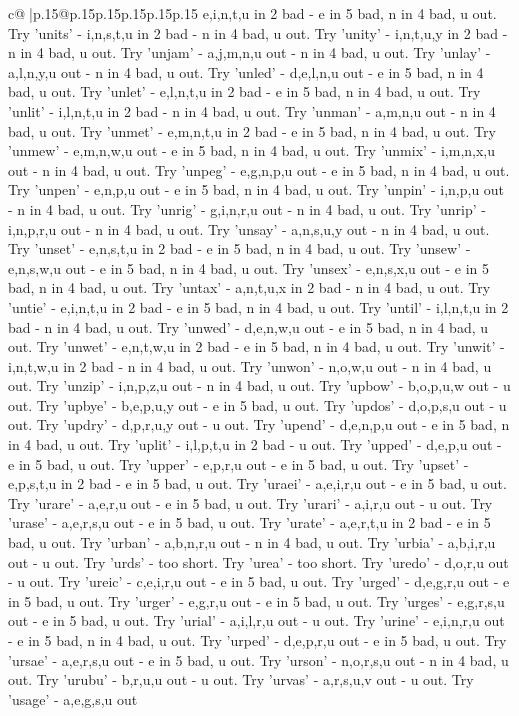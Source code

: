 \documentclass{article}
\begin{document}
{\begin{supertabular}{c@{$\;$}|p{.15\linewidth}@{}p{.15\linewidth}p{.15\linewidth}p{.15\linewidth}p{.15\linewidth}p{.15\linewidth}}
{{{e,i,n,t,u in 2 bad {-} e in 5 bad, n in 4 bad, u out. Try 'units' {-} i,n,s,t,u in 2 bad {-} n in 4 bad, u out. Try 'unity' {-} i,n,t,u,y in 2 bad {-} n in 4 bad, u out. Try 'unjam' {-} a,j,m,n,u out {-} n in 4 bad, u out. Try 'unlay' {-} a,l,n,y,u out {-} n in 4 bad, u out. Try 'unled' {-} d,e,l,n,u out {-} e in 5 bad, n in 4 bad, u out. Try 'unlet' {-} e,l,n,t,u in 2 bad {-} e in 5 bad, n in 4 bad, u out. Try 'unlit' {-} i,l,n,t,u in 2 bad {-} n in 4 bad, u out. Try 'unman' {-} a,m,n,u out {-} n in 4 bad, u out. Try 'unmet' {-} e,m,n,t,u in 2 bad {-} e in 5 bad, n in 4 bad, u out. Try 'unmew' {-} e,m,n,w,u out {-} e in 5 bad, n in 4 bad, u out. Try 'unmix' {-} i,m,n,x,u out {-} n in 4 bad, u out. Try 'unpeg' {-} e,g,n,p,u out {-} e in 5 bad, n in 4 bad, u out. Try 'unpen' {-} e,n,p,u out {-} e in 5 bad, n in 4 bad, u out. Try 'unpin' {-} i,n,p,u out {-} n in 4 bad, u out. Try 'unrig' {-} g,i,n,r,u out {-} n in 4 bad, u out. Try 'unrip' {-} i,n,p,r,u out {-} n in 4 bad, u out. Try 'unsay' {-} a,n,s,u,y out {-} n in 4 bad, u out. Try 'unset' {-} e,n,s,t,u in 2 bad {-} e in 5 bad, n in 4 bad, u out. Try 'unsew' {-} e,n,s,w,u out {-} e in 5 bad, n in 4 bad, u out. Try 'unsex' {-} e,n,s,x,u out {-} e in 5 bad, n in 4 bad, u out. Try 'untax' {-} a,n,t,u,x in 2 bad {-} n in 4 bad, u out. Try 'untie' {-} e,i,n,t,u in 2 bad {-} e in 5 bad, n in 4 bad, u out. Try 'until' {-} i,l,n,t,u in 2 bad {-} n in 4 bad, u out. Try 'unwed' {-} d,e,n,w,u out {-} e in 5 bad, n in 4 bad, u out. Try 'unwet' {-} e,n,t,w,u in 2 bad {-} e in 5 bad, n in 4 bad, u out. Try 'unwit' {-} i,n,t,w,u in 2 bad {-} n in 4 bad, u out. Try 'unwon' {-} n,o,w,u out {-} n in 4 bad, u out. Try 'unzip' {-} i,n,p,z,u out {-} n in 4 bad, u out. Try 'upbow' {-} b,o,p,u,w out {-} u out. Try 'upbye' {-} b,e,p,u,y out {-} e in 5 bad, u out. Try 'updos' {-} d,o,p,s,u out {-} u out. Try 'updry' {-} d,p,r,u,y out {-} u out. Try 'upend' {-} d,e,n,p,u out {-} e in 5 bad, n in 4 bad, u out. Try 'uplit' {-} i,l,p,t,u in 2 bad {-} u out. Try 'upped' {-} d,e,p,u out {-} e in 5 bad, u out. Try 'upper' {-} e,p,r,u out {-} e in 5 bad, u out. Try 'upset' {-} e,p,s,t,u in 2 bad {-} e in 5 bad, u out. Try 'uraei' {-} a,e,i,r,u out {-} e in 5 bad, u out. Try 'urare' {-} a,e,r,u out {-} e in 5 bad, u out. Try 'urari' {-} a,i,r,u out {-} u out. Try 'urase' {-} a,e,r,s,u out {-} e in 5 bad, u out. Try 'urate' {-} a,e,r,t,u in 2 bad {-} e in 5 bad, u out. Try 'urban' {-} a,b,n,r,u out {-} n in 4 bad, u out. Try 'urbia' {-} a,b,i,r,u out {-} u out. Try 'urds' {-} too short. Try 'urea' {-} too short. Try 'uredo' {-} d,o,r,u out {-} u out. Try 'ureic' {-} c,e,i,r,u out {-} e in 5 bad, u out. Try 'urged' {-} d,e,g,r,u out {-} e in 5 bad, u out. Try 'urger' {-} e,g,r,u out {-} e in 5 bad, u out. Try 'urges' {-} e,g,r,s,u out {-} e in 5 bad, u out. Try 'urial' {-} a,i,l,r,u out {-} u out. Try 'urine' {-} e,i,n,r,u out {-} e in 5 bad, n in 4 bad, u out. Try 'urped' {-} d,e,p,r,u out {-} e in 5 bad, u out. Try 'ursae' {-} a,e,r,s,u out {-} e in 5 bad, u out. Try 'urson' {-} n,o,r,s,u out {-} n in 4 bad, u out. Try 'urubu' {-} b,r,u,u out {-} u out. Try 'urvas' {-} a,r,s,u,v out {-} u out. Try 'usage' {-} a,e,g,s,u out }}}
\end{supertabular}}
\end{document}
